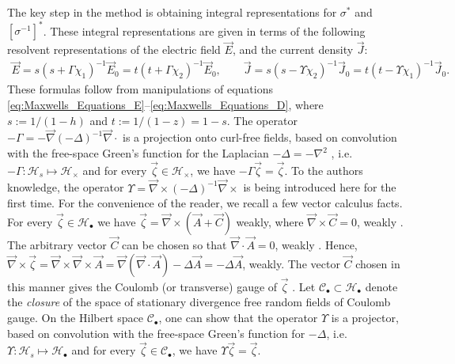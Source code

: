 \documentclass[jmp,graphicx]{revtex4-1}
\begin{document}
The key step in the method is obtaining integral representations for
$\sigma^*$ and $[\sigma^{-1}]^*$. These integral representations are given in
terms of the following resolvent representations of the electric field
$\vec{E}$, and the current density $\vec{J}$:  
%
\begin{align}\label{eq:Resolvent_representations_E_D}
  \vec{E}=s(s+\Gamma\chi_1)^{-1}\vec{E}_0=t(t+\Gamma\chi_2)^{-1}\vec{E}_0,\qquad
  \vec{J}=s(s-\Upsilon\chi_2)^{-1}\vec{J}_0=t(t-\Upsilon\chi_1)^{-1}\vec{J}_0.
\end{align}
%
These formulas follow from manipulations of equations
\eqref{eq:Maxwells_Equations_E}--\eqref{eq:Maxwells_Equations_D}, where
$s:=1/(1-h)$ and $t:=1/(1-z)=1-s$. The operator
$-\Gamma=-\vec{\nabla}(-\Delta)^{-1}\vec{\nabla}\cdot$ is a projection onto curl-free fields,
based on convolution with the free-space Green's function for the
Laplacian $-\Delta=-\nabla^2$ \cite{Golden:CMP-473},
i.e. $-\Gamma:\mathscr{H}_s\mapsto\mathscr{H}_\times$ and for every
$\vec{\zeta}\in\mathscr{H}_\times$, we have $-\Gamma\vec{\zeta}=\vec{\zeta}$. To the authors 
knowledge, the operator $\Upsilon=\vec{\nabla}\times(-\Delta)^{-1}\vec{\nabla}\times$ is being
introduced here for the first time. For the convenience of the reader,
we recall a few vector calculus facts. For every
$\vec{\zeta}\in\mathscr{H}_\bullet$ we have $\vec{\zeta}=\vec{\nabla}\times(\vec{A}+\vec{C})$
weakly, where $\vec{\nabla}\times\vec{C}=0$, weakly \cite{Jackson-1999}. The
arbitrary vector $\vec{C}$ can be chosen so that $\vec{\nabla}\cdot\vec{A}=0$,
weakly \cite{Jackson-1999}. Hence,
$\vec{\nabla}\times\vec{\zeta}=\vec{\nabla}\times\vec{\nabla}\times\vec{A}
=\vec{\nabla}(\vec{\nabla}\cdot\vec{A})-\Delta\vec{A}=-\Delta\vec{A}$, weakly. The vector
$\vec{C}$ chosen in this manner gives the Coulomb (or transverse)
gauge of $\vec{\zeta}$ \cite{Jackson-1999}. Let
$\mathscr{C}_{\bullet}\subset\mathscr{H}_{\bullet}$ denote the \emph{closure} of the
space of stationary divergence free random fields of Coulomb gauge. On
the Hilbert space $\mathscr{C}_{\bullet}$, one can show that the
operator $\Upsilon$ is a projector, based on convolution with the
free-space Green's function for $-\Delta$,
i.e. $\Upsilon:\mathscr{H}_s\mapsto\mathscr{H}_\bullet$ and for every
$\vec{\zeta}\in\mathscr{C}_\bullet$, we have $\Upsilon\vec{\zeta}=\vec{\zeta}$. 
\end{document}
